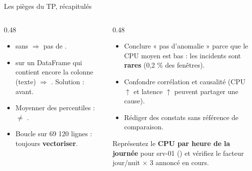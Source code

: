 \begin{frame}{Les pièges du TP, récapitulés}
\begin{columns}[t]
\begin{column}{0.48\textwidth}
\begin{wbox}
\begin{itemize}
\item {} sans  $\Rightarrow$ pas de .
\item {} sur un DataFrame qui contient encore
la colonne  (texte) $\Rightarrow$ . Solution :
 avant.
\item Moyenner des percentiles :  $\ne$ .
\item Boucle  sur 69 120 lignes : toujours \textbf{vectoriser}.
\end{itemize}
\end{wbox}
\end{column}
\begin{column}{0.48\textwidth}
\begin{wbox}
\begin{itemize}
\item Conclure « pas d'anomalie » parce que le CPU moyen est bas :
les incidents sont \textbf{rares} (0,2 \% des fenêtres).
\item Confondre corrélation et causalité (CPU $\uparrow$ et latence $\uparrow$
peuvent partager une cause).
\item Rédiger des constats sans référence de comparaison.
\end{itemize}
\end{wbox}
\begin{ebox}
Représentez le \textbf{CPU par heure de la journée} pour srv-01
() et vérifiez le facteur
jour/nuit $\times$ 3 annoncé en cours.
\end{ebox}
\end{column}
\end{columns}
\end{frame}

